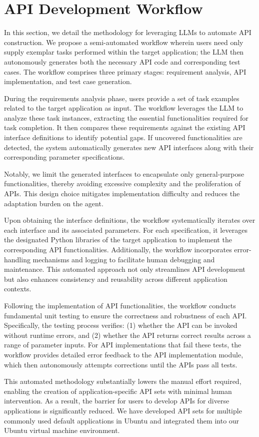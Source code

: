 \section{API Development Workflow}\label{apdx:api_construction}
In this section, we detail the methodology for leveraging LLMs to automate API construction. We propose a semi-automated workflow wherein users need only supply exemplar tasks performed within the target application; the LLM then autonomously generates both the necessary API code and corresponding test cases. The workflow comprises three primary stages: requirement analysis, API implementation, and test case generation.

During the requirements analysis phase, users provide a set of task examples related to the target application as input. The workflow leverages the LLM to analyze these task instances, extracting the essential functionalities required for task completion. It then compares these requirements against the existing API interface definitions to identify potential gaps. If uncovered functionalities are detected, the system automatically generates new API interfaces along with their corresponding parameter specifications.

Notably, we limit the generated interfaces to encapsulate only general-purpose functionalities, thereby avoiding excessive complexity and the proliferation of APIs. This design choice mitigates implementation difficulty and reduces the adaptation burden on the agent.

Upon obtaining the interface definitions, the workflow systematically iterates over each interface and its associated parameters. For each specification, it leverages the designated Python libraries of the target application to implement the corresponding API functionalities. Additionally, the workflow incorporates error-handling mechanisms and logging to facilitate human debugging and maintenance. This automated approach not only streamlines API development but also enhances consistency and reusability across different application contexts.

Following the implementation of API functionalities, the workflow conducts fundamental unit testing to ensure the correctness and robustness of each API. Specifically, the testing process verifies: (1) whether the API can be invoked without runtime errors, and (2) whether the API returns correct results across a range of parameter inputs. For API implementations that fail these tests, the workflow provides detailed error feedback to the API implementation module, which then autonomously attempts corrections until the APIs pass all tests.

This automated methodology substantially lowers the manual effort required, enabling the creation of application-specific API sets with minimal human intervention. As a result, the barrier for users to develop APIs for diverse applications is significantly reduced. We have developed API sets for multiple commonly used default applications in Ubuntu and integrated them into our Ubuntu virtual machine environment.

\newpage